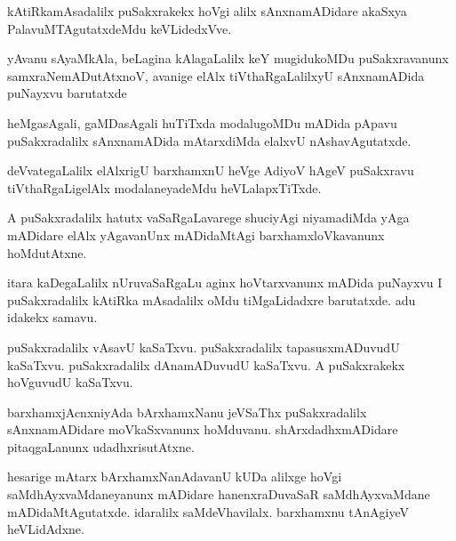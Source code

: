 \documentclass{article}
\begin{document}
\begin{mn}
kAtiRkamAsadalilx  puSakxrakekx  hoVgi  alilx  sAnxnamADidare  akaSxya  PalavuMTAgutatxdeMdu  keVLidedxVve.
\end{mn}

\begin{mn}
yAvanu  sAyaMkAla,  beLagina  kAlagaLalilx  keY mugidukoMDu  puSakxravanunx  
samxraNemADutAtxnoV,  avanige  elAlx  tiVthaRgaLalilxyU  sAnxnamADida  puNayxvu  barutatxde
\end{mn}

\begin{mn}
heMgasAgali,  gaMDasAgali  huTiTxda  modalugoMDu  mADida  pApavu  puSakxradalilx  
sAnxnamADida  mAtarxdiMda  elalxvU  nAshavAgutatxde.
\end{mn}

\begin{mn}
deVvategaLalilx  elAlxrigU  barxhamxnU  heVge  AdiyoV  hAgeV  puSakxravu  
tiVthaRgaLigelAlx  modalaneyadeMdu  heVLalapxTiTxde. 
\end{mn}  

\begin{mn}
A puSakxradalilx  hatutx  vaSaRgaLavarege  shuciyAgi  niyamadiMda  yAga mADidare  elAlx  
yAgavanUnx  mADidaMtAgi  barxhamxloVkavanunx  hoMdutAtxne.
\end{mn}

\begin{mn}
itara  kaDegaLalilx  nUruvaSaRgaLu  aginx hoVtarxvanunx  mADida  puNayxvu  I  puSakxradalilx  
kAtiRka mAsadalilx  oMdu  tiMgaLidadxre  barutatxde.  adu  idakekx samavu.
\end{mn}

\begin{mn}
puSakxradalilx  vAsavU  kaSaTxvu.  puSakxradalilx  tapasusxmADuvudU  kaSaTxvu.  
puSakxradalilx  dAnamADuvudU  kaSaTxvu.  A  puSakxrakekx  hoVguvudU kaSaTxvu.
\end{mn}

\begin{mn}
barxhamxjAcnxniyAda  bArxhamxNanu  jeVSaThx puSakxradalilx  sAnxnamADidare  
moVkaSxvanunx  hoMduvanu. shArxdadhxmADidare  pitaqgaLanunx  udadhxrisutAtxne. 
\end{mn}

\begin{mn}
hesarige  mAtarx  bArxhamxNanAdavanU  kUDa  alilxge  hoVgi  saMdhAyxvaMdaneyanunx  
mADidare  hanenxraDuvaSaR  saMdhAyxvaMdane  mADidaMtAgutatxde.  idaralilx  
saMdeVhavilalx.  barxhamxnu  tAnAgiyeV  heVLidAdxne.
\end{mn}
\end{document}
